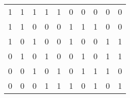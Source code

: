 \begin{tabular}{rrrgrrrrrr}
1&1&1&1&1&0&0&0&0&0\\
1&1&0&0&0&1&1&1&0&0\\
1&0&1&0&0&1&0&0&1&1\\
0&1&0&1&0&0&1&0&1&1\\
0&0&1&0&1&0&1&1&1&0\\
0&0&0&1&1&1&0&1&0&1\\
\end{tabular}
